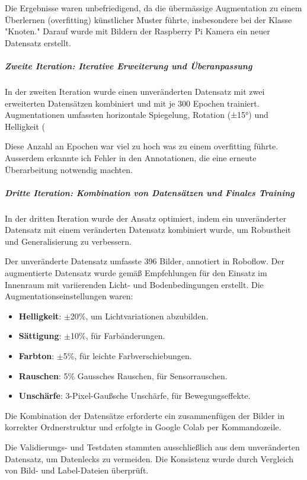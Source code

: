 Die Ergebnisse waren unbefriedigend, da die übermässige Augmentation zu einem Überlernen (overfitting) künstlicher Muster führte, insbesondere bei der Klasse "Knoten." Darauf wurde mit Bildern der Raspberry Pi Kamera ein neuer Datensatz erstellt.


\subparagraph{Zweite Iteration: Iterative Erweiterung und Überanpassung}

In der zweiten Iteration wurde einen unveränderten Datensatz mit zwei erweiterten Datensätzen kombiniert und mit je 300 Epochen trainiert.
Augmentationen umfassten horizontale Spiegelung, Rotation (±15°) und Helligkeit (

Diese Anzahl an Epochen war viel zu hoch was zu einem overfitting führte. Ausserdem erkannte ich Fehler in den Annotationen, die eine erneute Überarbeitung notwendig machten.

\subparagraph{Dritte Iteration: Kombination von Datensätzen und Finales Training}

In der dritten Iteration wurde der Ansatz optimiert, indem ein unveränderter Datensatz mit einem veränderten Datensatz kombiniert wurde, um Robustheit und Generalisierung zu verbessern.

Der unveränderte Datensatz umfasste 396 Bilder, annotiert in Roboflow. Der augmentierte Datensatz wurde gemäß Empfehlungen für den Einsatz im Innenraum mit variierenden Licht- und Bodenbedingungen erstellt. Die Augmentationseinstellungen waren:

\begin{itemize} 
    \item \textbf{Helligkeit}: $\pm$20\%, um Lichtvariationen abzubilden. 
    \item \textbf{Sättigung}: $\pm$10\%, für Farbänderungen. 
    \item \textbf{Farbton}: $\pm$5\%, für leichte Farbverschiebungen. 
    \item \textbf{Rauschen}: 5\% Gaussches Rauschen, für Sensorrauschen. 
    \item \textbf{Unschärfe}: 3-Pixel-Gaußsche Unschärfe, für Bewegungseffekte. 
\end{itemize}
Die Kombination der Datensätze erforderte ein zusammenfügen der Bilder in korrekter Ordnerstruktur und erfolgte in Google Colab per Kommandozeile.

Die Validierungs- und Testdaten stammten ausschließlich aus dem unveränderten Datensatz, um Datenlecks zu vermeiden. Die Konsistenz wurde durch Vergleich von Bild- und Label-Dateien überprüft.

